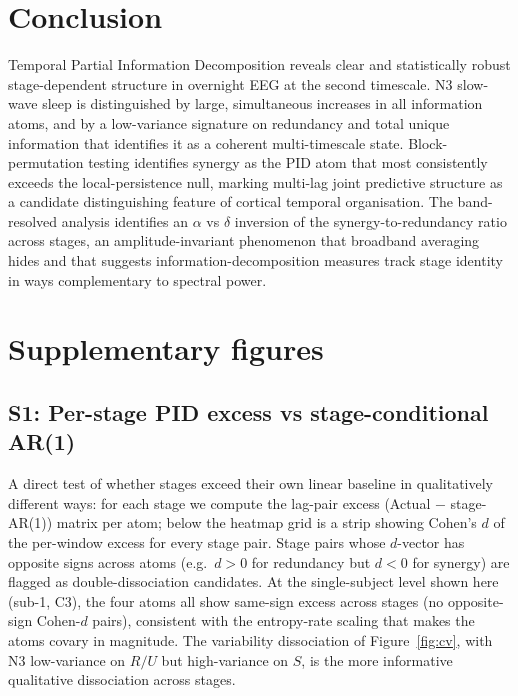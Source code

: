 \documentclass[11pt,a4paper]{article}
\begin{document}
\section{Conclusion}

Temporal Partial Information Decomposition reveals clear and statistically
robust stage-dependent structure in overnight EEG at the second timescale.
N3 slow-wave sleep is distinguished by large, simultaneous increases in
all information atoms, and by a low-variance signature on redundancy and
total unique information that identifies it as a coherent multi-timescale
state.  Block-permutation testing identifies synergy as the PID atom that
most consistently exceeds the local-persistence null, marking multi-lag
joint predictive structure as a candidate distinguishing feature of
cortical temporal organisation.  The band-resolved analysis identifies an
$\alpha$ vs $\delta$ inversion of the synergy-to-redundancy ratio across
stages, an amplitude-invariant phenomenon that broadband averaging hides
and that suggests information-decomposition measures track stage
identity in ways complementary to spectral power.

\section*{Supplementary figures}

\subsection*{S1: Per-stage PID excess vs stage-conditional AR(1)}
\label{sec:supp:per_stage_excess}

A direct test of whether stages exceed their own linear baseline in
qualitatively different ways: for each stage we compute the lag-pair
excess (Actual $-$ stage-AR(1)) matrix per atom; below the heatmap grid
is a strip showing Cohen's $d$ of the per-window excess for every stage
pair.  Stage pairs whose $d$-vector has opposite signs across atoms
(e.g.\ $d > 0$ for redundancy but $d < 0$ for synergy) are flagged as
double-dissociation candidates.  At the single-subject level shown here
(sub-1, C3), the four atoms all show same-sign excess across stages (no
opposite-sign Cohen-$d$ pairs), consistent with the entropy-rate scaling
that makes the atoms covary in magnitude.  The variability dissociation
of Figure~\ref{fig:cv}, with N3 low-variance on $R / U$ but high-variance
on $S$, is the more informative qualitative dissociation across stages.
\end{document}
